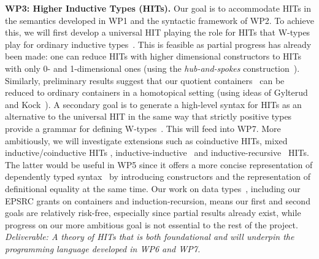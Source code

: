 \documentclass[a4paper,11pt]{article}
\begin{document}
{\bf WP3: Higher Inductive Types (HITs).} Our goal is to accommodate HITs in
the semantics developed in WP1 and the syntactic framework of WP2. To
achieve this, we will first develop a universal HIT playing the role for
HITs that W-types play for ordinary inductive
types~\cite{alti:icalp04}. This is feasible as partial progress has
already been made: one can reduce HITs with higher dimensional
constructors to HITs with only 0- and 1-dimensional ones (using the
\emph{hub-and-spokes} construction~\cite{hott-book}).
Similarly, preliminary results suggest that our quotient
containers~\cite{alti:mpc04} can be reduced
to ordinary containers in a homotopical setting 
(using ideas of Gylterud~\cite{gylterud:thesis} and
Kock~\cite{kock:groupoids}).
%
A secondary goal is to generate a high-level syntax for HITs as
an alternative to the universal HIT in the same way that strictly
positive types provide a grammar for defining 
W-types~\cite{alti:cont-tcs,alti:jcats07}.  This will feed into WP7.
More ambitiously, we will %
investigate extensions such as coinductive HITs, mixed
inductive/coinductive HITs \cite{txa:mpc2010g}, 
inductive-inductive~\cite{fnf:indind} and
inductive-recursive~\cite{DS:indrec} HITs. The latter would be useful
in WP5 since it offers a more concise representation of dependently
typed syntax~\cite{chapman2009type} by introducing
constructors and the representation of definitional equality at the
same time.
Our work on data
types~\cite{alti:cont-tcs,alti:lics09,alti:catind2,ghani:fibredIR,gambinoHyland:welfoundedTrees,awodeyGamSoja:indTypesInHTT},
including our EPSRC grants on containers and induction-recursion, means
our first and second goals
are relatively risk-free,
especially since partial results already exist, 
while progress on our more ambitious goal 
is not essential to the rest of the project. {\em Deliverable: A
  theory of HITs that is both foundational and will underpin the
  programming language developed in WP6 and WP7. 
}
\end{document}
